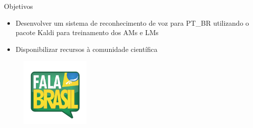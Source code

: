 \begin{frame}{Objetivos}
\begin{itemize}
    \item Desenvolver um sistema de reconhecimento de voz para PT\_BR utilizando o pacote Kaldi para treinamento dos AMs e LMs
\end{itemize}

\begin{itemize}
    \item Disponibilizar recursos \`a comunidade cient\'ifica
\end{itemize}
\begin{figure}
\begin{center}
	\includegraphics[width=0.3\textwidth]{Figures/falabrasil}
\end{center}
\end{figure}

\end{frame}
